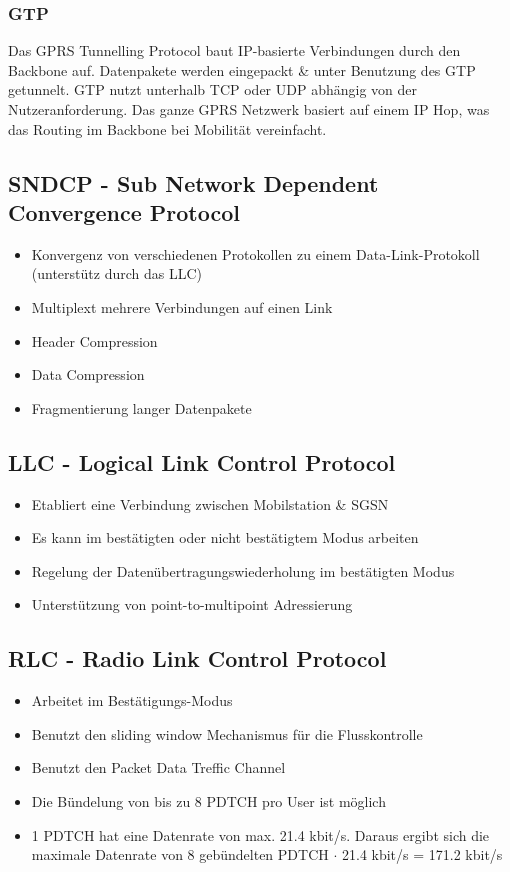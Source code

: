 \subsubsection{GTP}
Das GPRS Tunnelling Protocol baut IP-basierte Verbindungen durch den Backbone auf. Datenpakete werden eingepackt \& unter Benutzung des GTP getunnelt. GTP nutzt unterhalb TCP oder UDP  abhängig von der Nutzeranforderung. Das ganze GPRS Netzwerk basiert auf einem IP Hop, was das Routing im Backbone bei Mobilität vereinfacht.

\subsection{SNDCP - Sub Network Dependent Convergence Protocol}
\begin{itemize}
\item Konvergenz von verschiedenen Protokollen zu einem Data-Link-Protokoll (unterstütz durch das LLC)
\item Multiplext mehrere Verbindungen auf einen Link
\item Header Compression
\item Data Compression
\item Fragmentierung langer Datenpakete
\end{itemize}

\subsection{LLC - Logical Link Control Protocol}

\begin{itemize}
\item Etabliert eine Verbindung zwischen Mobilstation \& SGSN
\item Es kann im bestätigten oder nicht bestätigtem Modus arbeiten
\item Regelung der Datenübertragungswiederholung im bestätigten Modus
\item Unterstützung von point-to-multipoint Adressierung
\end{itemize}

\subsection{RLC - Radio Link Control Protocol}

\begin{itemize}
\item Arbeitet im Bestätigungs-Modus
\item Benutzt den sliding window Mechanismus für die Flusskontrolle
\item Benutzt den Packet Data Treffic Channel
\item Die Bündelung von bis zu 8 PDTCH pro User ist möglich
\item 1 PDTCH hat eine Datenrate von max. 21.4 kbit/s. Daraus ergibt sich die maximale Datenrate von 8 gebündelten PDTCH $\cdot$ 21.4 kbit/s = 171.2 kbit/s
\end{itemize}

